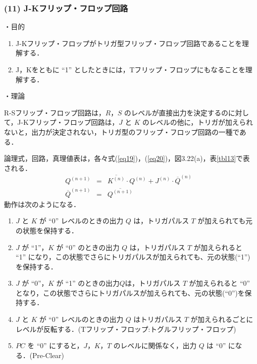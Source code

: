 \subsubsection*{(11) J-Kフリップ・フロップ回路}
\noindent
・目的 \vspace{2mm}

\begin{enumerate}
    \item J-Kフリップ・フロップがトリガ型フリップ・フロップ回路であることを理解する．
    \item J，Kをともに ``1'' としたときには，Tフリップ・フロップにもなることを理解する．
\end{enumerate}

\vspace{7mm}
\noindent
・理論 \vspace{2mm}

R-Sフリップ・フロップ回路は，$R$，$S$ のレベルが直接出力を決定するのに対して，J-Kフリップ・フロップ回路は，$J$ と $K$ のレベルの他に，トリガが加えられないと，出力が決定されない，トリガ型のフリップ・フロップ回路の一種である．

論理式，回路，真理値表は，各々式(\ref{eq19})，(\ref{eq20})，図3.22(a)，表\ref{tbl13}で表される．
\begin{eqnarray}
    Q^{(n+1)} &=& \overline{K^{(n)}} \cdot Q^{(n)} + J^{(n)} \cdot {\overline{Q}}^{(n)} \label{eq19} \\
    {\overline{Q}}^{(n+1)} &=& \overline{Q^{(n+1)}} \label{eq20}
\end{eqnarray}
動作は次のようになる．
\begin{enumerate}
    \item $J$ と $K$ が ``0'' レベルのときの出力 $Q$ は，トリガパルス $T$ が加えられても元の状態を保持する．
    \item $J$ が ``1''，$K$ が ``0'' のときの出力 $Q$ は，トリガパルス $T$ が加えられると ``1'' になり，この状態でさらにトリガパルスが加えられても、元の状態(``1'')を保持する．
    \item $J$ が ``0''，$K$ が ``1'' のときの出力$Q$は，トリガパルス $T$ が加えられると ``0'' となり，この状態でさらにトリガパルスが加えられても、元の状態(``0'')を保持する．
    \item $J$ と $K$ が ``0'' レベルのときの出力 $Q$ はトリガパルス $T$ が加えられるごとにレベルが反転する．(Tフリップ・フロップ:トグルフリップ・フロップ)
    \item $PC$ を ``0'' にすると，$J$，$K$，$T$ のレベルに関係なく，出力 $Q$ は ``0'' になる．(Pre-Clear)
\end{enumerate}

